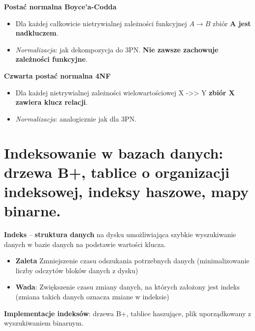 \documentclass[main.tex]{subfiles}
\begin{document}
    \noindent \textbf{Postać normalna Boyce'a-Codda}
    \begin{itemize}[noitemsep]
        \item Dla każdej całkowicie nietrywialnej zależności funkcyjnej $A \rightarrow B$ zbiór \textbf{A jest nadkluczem}.
        \item \textit{Normalizacja}: jak dekompozycja do 3PN. \textbf{Nie zawsze zachowuje zależności funkcyjne}.
    \end{itemize}

    \noindent \textbf{Czwarta postać normalna 4NF}
    \begin{itemize}[noitemsep]
        \item Dla każdej nietrywialnej zależności wielowartościowej X ->> Y \textbf{zbiór X zawiera klucz relacji}.
        \item \textit{Normalizacja}: analogicznie jak dla 3PN.
    \end{itemize}


    \section{Indeksowanie w bazach danych: drzewa B+, tablice o organizacji indeksowej, indeksy haszowe, mapy binarne.}

    \textbf{Indeks} -- \textbf{struktura danych} na dysku umożliwiająca szybkie wyszukiwanie danych w bazie danych
    na podstawie wartości klucza.

    \begin{itemize}[noitemsep]
        \item \textbf{Zaleta} Zmniejszenie czasu odszukania potrzebnych danych (minimalizowanie liczby odczytów bloków danych z dysku)
        \item \textbf{Wada}: Zwiększenie czasu zmiany danych, na których założony jest indeks (zmiana takich danych oznacza zmiane w indeksie)
    \end{itemize}

    \noindent \textbf{Implementacje indeksów}: drzewa B+, tablice haszujące, plik uporządkowany z wyszukiwaniem binarnym.\\
\end{document}
